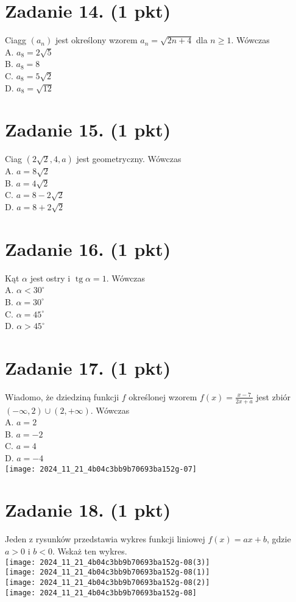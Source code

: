 \documentclass[10pt]{article}
\begin{document}
\section*{Zadanie 14. (1 pkt)}
Ciagg \(\left(a_{n}\right)\) jest określony wzorem \(a_{n}=\sqrt{2 n+4}\) dla \(n \geq 1\). Wówczas\\
A. \(a_{8}=2 \sqrt{5}\)\\
B. \(a_{8}=8\)\\
C. \(a_{8}=5 \sqrt{2}\)\\
D. \(a_{8}=\sqrt{12}\)

\section*{Zadanie 15. (1 pkt)}
Ciag \((2 \sqrt{2}, 4, a)\) jest geometryczny. Wówczas\\
A. \(a=8 \sqrt{2}\)\\
B. \(a=4 \sqrt{2}\)\\
C. \(a=8-2 \sqrt{2}\)\\
D. \(a=8+2 \sqrt{2}\)

\section*{Zadanie 16. (1 pkt)}
Kąt \(\alpha\) jest ostry i \(\operatorname{tg} \alpha=1\). Wówczas\\
A. \(\alpha<30^{\circ}\)\\
B. \(\alpha=30^{\circ}\)\\
C. \(\alpha=45^{\circ}\)\\
D. \(\alpha>45^{\circ}\)

\section*{Zadanie 17. (1 pkt)}
Wiadomo, że dziedziną funkcji \(f\) określonej wzorem \(f(x)=\frac{x-7}{2 x+a}\) jest zbiór \((-\infty, 2) \cup(2,+\infty)\). Wówczas\\
A. \(a=2\)\\
B. \(a=-2\)\\
C. \(a=4\)\\
D. \(a=-4\)\\
\texttt{[image: 2024\_11\_21\_4b04c3bb9b70693ba152g-07]}

\section*{Zadanie 18. (1 pkt)}
Jeden z rysunków przedstawia wykres funkcji liniowej \(f(x)=a x+b\), gdzie \(a>0\) i \(b<0\). Wskaż ten wykres.\\
\texttt{[image: 2024\_11\_21\_4b04c3bb9b70693ba152g-08(3)]}\\
\texttt{[image: 2024\_11\_21\_4b04c3bb9b70693ba152g-08(1)]}\\
\texttt{[image: 2024\_11\_21\_4b04c3bb9b70693ba152g-08(2)]}\\
\texttt{[image: 2024\_11\_21\_4b04c3bb9b70693ba152g-08]}
\end{document}
